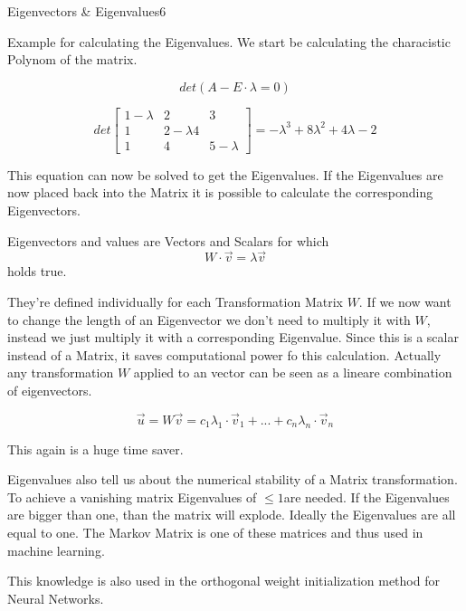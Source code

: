 \begin{questions}
\begin{question}{Eigenvectors \& Eigenvalues}{6}
\begin{answer}
Example for calculating the Eigenvalues. We start be calculating the characistic Polynom of the matrix.

\begin{equation}
	det(A-E\cdot \lambda = 0)
\end{equation}

\begin{equation}
	det
	\begin{bmatrix}
	1-\lambda & 2 & 3 \\
	1 & 2-\lambda 4 \\
	1 & 4 & 5-\lambda
	\end{bmatrix}
	= -\lambda^3 + 8 \lambda^2 + 4\lambda - 2
\end{equation}

This equation can now be solved to get the Eigenvalues. If the Eigenvalues are now placed back into the Matrix it is possible to calculate the corresponding Eigenvectors.

Eigenvectors and values are Vectors and Scalars for which 
\begin{equation}
	W\cdot \vec{v} = \lambda \vec{v}
\end{equation}
holds true.

They're defined individually for each Transformation Matrix $W$. 
If we now want to change the length of an Eigenvector we don't need to multiply it with $W$, instead we just multiply it with a corresponding Eigenvalue. Since this is a scalar instead of a Matrix, it saves computational power fo this calculation. Actually any transformation $W$ applied to an vector can be seen as a lineare combination of eigenvectors.

\begin{equation}
	\vec{u} = W \vec{v} = c_1 \lambda_1 \cdot \vec{v}_1 + ... + c_n \lambda_n \cdot \vec{v}_n
\end{equation}

This again is a huge time saver.

Eigenvalues also tell us about the numerical stability of a Matrix transformation. To achieve a vanishing matrix Eigenvalues of $\leq 1$are needed. If the Eigenvalues are bigger than one, than the matrix will explode. Ideally the Eigenvalues are all equal to one. The Markov Matrix is one of these matrices and thus used in machine learning. 

This knowledge is also used in the orthogonal weight initialization method for Neural Networks.


\end{answer}

\end{question}


\end{questions}
